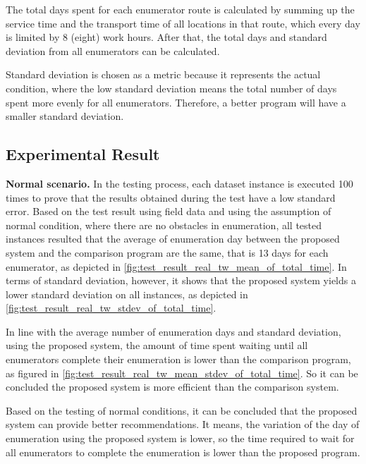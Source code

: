 \documentclass[conference]{IEEEtran}
\begin{document}
The total days spent for each enumerator route is calculated by summing up the service time and the transport time of all locations in that route, which every day is limited by 8 (eight) work hours. After that, the total days and standard deviation from all enumerators can be calculated.

Standard deviation is chosen as a metric because it represents the actual condition, where the low standard deviation means the total number of days spent more evenly for all enumerators. Therefore, a better program will have a smaller standard deviation.

\subsection{Experimental Result}
\label{ssec:experimental-result}

\textbf{Normal scenario.} In the testing process, each dataset instance is executed 100 times to prove that the results obtained during the test have a low standard error. Based on the test result using field data and using the assumption of normal condition, where there are no obstacles in enumeration, all tested instances resulted that the average of enumeration day between the proposed system and the comparison program are the same, that is 13 days for each enumerator, as depicted in  \autoref{fig:test_result_real_tw_mean_of_total_time}. In terms of standard deviation, however, it shows that the proposed system yields a lower standard deviation on all instances, as depicted in \autoref{fig:test_result_real_tw_stdev_of_total_time}.

In line with the average number of enumeration days and standard deviation, using the proposed system, the amount of time spent waiting until all enumerators complete their enumeration is lower than the comparison program, as figured in \autoref{fig:test_result_real_tw_mean_stdev_of_total_time}. So it can be concluded the proposed system is more efficient than the comparison system.

Based on the testing of normal conditions, it can be concluded that the proposed system can provide better recommendations. It means, the variation of the day of enumeration using the proposed system is lower, so the time required to wait for all enumerators to complete the enumeration is lower than the proposed program.
\end{document}
